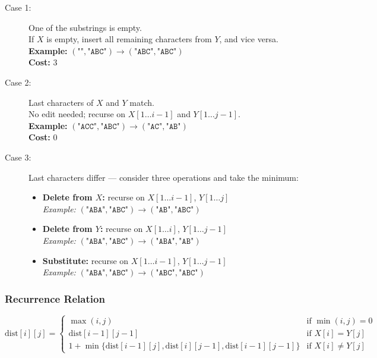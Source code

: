 \documentclass{article}
\begin{document}
\begin{description}
  \item[Case 1:] One of the substrings is empty. \\
  If $X$ is empty, insert all remaining characters from $Y$, and vice versa. \\
  \textbf{Example:} $(\texttt{""}, \texttt{"ABC"}) \rightarrow (\texttt{"ABC"}, \texttt{"ABC"})$ \\
  \textbf{Cost:} 3

  \item[Case 2:] Last characters of $X$ and $Y$ match. \\
  No edit needed; recurse on $X[1 \ldots i-1]$ and $Y[1 \ldots j-1]$. \\
  \textbf{Example:} $(\texttt{"ACC"}, \texttt{"ABC"}) \rightarrow (\texttt{"AC"}, \texttt{"AB"})$ \\
  \textbf{Cost:} 0

  \item[Case 3:] Last characters differ — consider three operations and take the minimum:
  \begin{itemize}
    \item \textbf{Delete from $X$:} recurse on $X[1 \ldots i-1]$, $Y[1 \ldots j]$ \\
    \textit{Example:} $(\texttt{"ABA"}, \texttt{"ABC"}) \rightarrow (\texttt{"AB"}, \texttt{"ABC"})$
    
    \item \textbf{Delete from $Y$:} recurse on $X[1 \ldots i]$, $Y[1 \ldots j-1]$ \\
    \textit{Example:} $(\texttt{"ABA"}, \texttt{"ABC"}) \rightarrow (\texttt{"ABA"}, \texttt{"AB"})$
    
    \item \textbf{Substitute:} recurse on $X[1 \ldots i-1]$, $Y[1 \ldots j-1]$ \\
    \textit{Example:} $(\texttt{"ABA"}, \texttt{"ABC"}) \rightarrow (\texttt{"ABC"}, \texttt{"ABC"})$
  \end{itemize}
\end{description}

\subsubsection*{Recurrence Relation}

\[
\text{dist}[i][j] =
\begin{cases}
\max(i, j) & \text{if } \min(i, j) = 0 \\
\text{dist}[i-1][j-1] & \text{if } X[i] = Y[j] \\
1 + \min\{\text{dist}[i-1][j], \text{dist}[i][j-1], \text{dist}[i-1][j-1]\} & \text{if } X[i] \neq Y[j]
\end{cases}
\]
\end{document}
